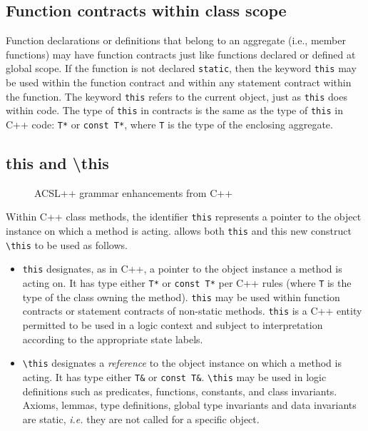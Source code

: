 
\subsection{Function contracts within class scope}

Function declarations or definitions that belong to an aggregate (i.e., member functions) may have function
contracts just like functions declared or defined at global scope. If the function is not declared \lstinline|static|, then
the keyword \lstinline|this| may be used within the function
contract and within any statement contract within the 
function. The keyword \lstinline|this| refers to the current
object, just as \lstinline|this| does within \lang code.
The type of \lstinline|this| in contracts is the same as the type of \lstinline|this| in C++ code: \lstinline|T*| or \lstinline|const T*|, where \lstinline|T| is the type of the enclosing aggregate.


\subsection{\textbf{this} and \textbf{\textbackslash this}}


\begin{figure}
\begin{cadre}

\end{cadre}
\caption{ACSL++ grammar enhancements from C++}
\label{fig:gram:this}
\end{figure}

Within C++ class methods, the identifier \lstinline|this| represents a
pointer to the object instance on which a method is acting. \NAME
allows both \lstinline|this| and this new construct \lstinline|\this| 
to be used as follows.
\begin{itemize}
\item \lstinline|this| designates, as in C++, a pointer to the object
instance a method is acting on. It has type either \lstinline|T*|
or \lstinline|const T*| per C++ rules (where \lstinline|T| is the type
of the class owning the method). \lstinline|this| may be used
within function contracts or statement contracts of non-static methods.
\lstinline|this| is a C++ entity permitted to be used in a logic context
and subject to interpretation according to the appropriate state labels.

\item \lstinline|\this| designates a \textit{reference} to the object
  instance on which a method is acting. It has type either
  \lstinline|T&| or \lstinline|const T&|.  \lstinline|\this| may be
  used in logic definitions such as predicates, functions, constants,
  and class invariants. Axioms, lemmas, type definitions, global type
  invariants and data invariants are static, {\it i.e.} they
  are not called for a specific object.

\end{itemize}

